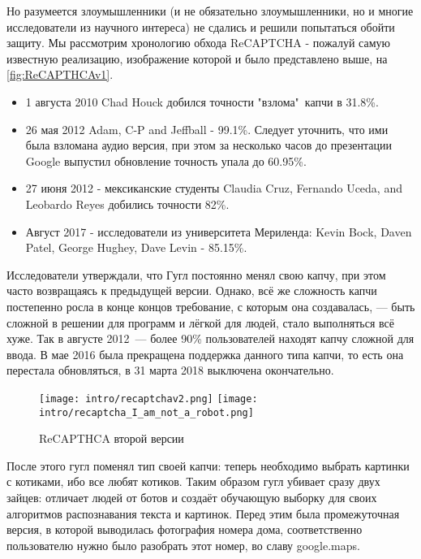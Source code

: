 Но разумеется злоумышленники (и не обязательно злоумышленники, но и многие исследователи из научного интереса) не сдались и решили попытаться обойти защиту. Мы рассмотрим хронологию обхода ReCAPTCHA \-- пожалуй самую известную реализацию, изображение которой и было представлено выше, на \autoref{fig:ReCAPTHCAv1}.

\begin{itemize}
    \item 1 августа 2010 Chad Houck добился точности "взлома"\ капчи в 31.8\%.
    \item 26 мая 2012 Adam, C-P and Jeffball \-- 99.1\%. Следует уточнить, что ими была взломана аудио версия, при этом за несколько часов до презентации Google выпустил обновление  точность упала до 60.95\%.
    \item 27 июня 2012 - мексиканские студенты Claudia Cruz, Fernando Uceda, and Leobardo Reyes добились точности 82\%.
    \item Август 2017 - исследователи из университета Мериленда: Kevin Bock, Daven Patel, George Hughey, Dave Levin - 85.15\%.
\end{itemize}

Исследователи утверждали, что Гугл постоянно менял свою капчу, при этом часто возвращаясь к предыдущей версии\cite{wiki:captcha_is_hard}. Однако, всё же сложность капчи постепенно росла в конце концов требование, с которым она создавалась, --- быть сложной в решении для программ и лёгкой для людей, стало выполняться всё хуже. Так в августе 2012~--- более 90\% пользователей находят капчу сложной для ввода\cite{wiki:captcha_is_hard}. В мае 2016 была прекращена поддержка данного типа капчи, то есть она перестала обновляться, в 31 марта 2018 выключена окончательно.\cite{google:choose_recaptcha}\\

\begin{wrapfigure}{l}{0.4\textwidth}
    \vspace{-0.5cm}
    \texttt{[image: intro/recaptchav2.png]}
    \texttt{[image: intro/recaptcha\_I\_am\_not\_a\_robot.png]}
    \caption{ReCAPTHCA второй версии}
\end{wrapfigure}

После этого гугл поменял тип своей капчи: теперь необходимо выбрать картинки с котиками, ибо все любят котиков. Таким образом гугл убивает сразу двух зайцев: отличает людей от ботов и создаёт обучающую выборку для своих алгоритмов распознавания текста и картинок. Перед этим была промежуточная версия, в которой выводилась фотография номера дома, соответственно пользователю нужно было разобрать этот номер, во славу google.maps.\\

